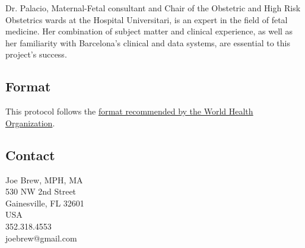 \documentclass{article}
\begin{document}
\begin{multicols}{2}
Dr. Palacio, Maternal-Fetal consultant and Chair of the Obstetric and High Risk Obstetrics wards at the Hospital Universitari, is an expert in the field of fetal medicine.  Her combination of subject matter and clinical experience, as well as her familiarity with Barcelona's clinical and data systems, are essential to this project's success.  


\subsection*{Format}
This protocol follows the \href{http://www.who.int/rpc/research_ethics/format_rp/en/}{format recommended by the World Health Organization}. \\

\vfill
\columnbreak

\subsection*{Contact}
Joe Brew, MPH, MA\\
530 NW 2nd Street \\
Gainesville, FL 32601 \\
USA \\
352.318.4553 \\
joebrew@gmail.com


\end{multicols}
\newpage


\end{document}
